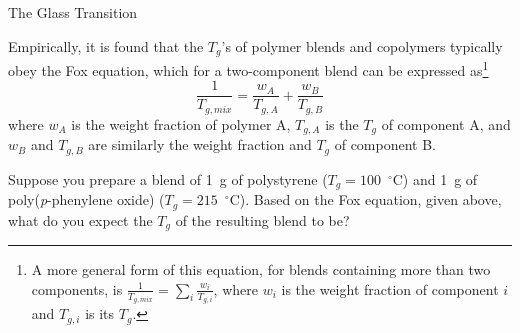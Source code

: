 \begin{activity}{The Glass Transition}
\begin{exercises}
	
		
	
	
	\exercise Empirically, it is found that the $T_g$'s of polymer blends and copolymers typically obey the Fox equation, which for a two-component blend can be expressed as\footnote{A more general form of this equation, for blends containing more than two components, is $\frac{1}{T_{g,mix}} = \sum_i \frac{w_i}{T_{g,i}}$, where $w_i$ is the weight fraction of component $i$ and $T_{g,i}$ is its $T_g$.}
		\begin{equation*}
			\frac{1}{T_{g,mix}} = \frac{w_A}{T_{g,A}} + \frac{w_B}{T_{g,B}}
		\end{equation*}
		where $w_A$ is the weight fraction of polymer A, $T_{g,A}$ is the $T_g$ of component A, and $w_B$ and $T_{g,B}$ are similarly the weight fraction and $T_g$ of component B.
		
		Suppose you prepare a blend of 1~g of polystyrene ($T_g = 100$~$^\circ$C) and 1~g of poly(\emph{p}-phenylene oxide) ($T_g = 215$~$^\circ$C).  Based on the Fox equation, given above, what do you expect the $T_g$ of the resulting blend to be?
		

\end{exercises}
\end{activity}

